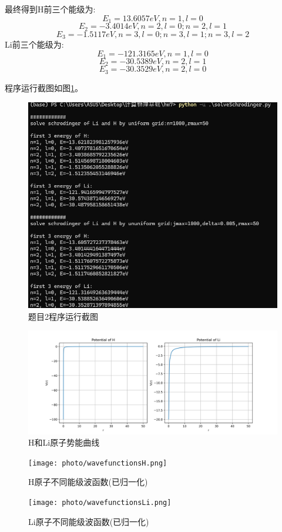 \documentclass[11pt]{article}
\begin{document}
最终得到H前三个能级为:
\[E_1=13.6057eV ,n=1,l=0
\]
\[
E_2=-3.4014eV ,n=2,l=0;n=2,l=1
\]
\[
E_3=-1.5117eV ,n=3,l=0;n=3,l=1;n=3,l=2
\]
Li前三个能级为:
\[
E_1=-121.3165eV ,n=1,l=0
\]
\[
E_2=-30.5389eV ,n=2,l=1
\]
\[
E_3=-30.3529eV ,n=2,l=0
\]

程序运行截图如图\ref{fig:p2}。

\begin{figure}
  \centering
  \includegraphics[width=0.8\linewidth]{photo/figp2.png}
  \caption{题目2程序运行截图}
  \label{fig:p2}
\end{figure}


\begin{figure}
  \centering
  \includegraphics[width=1\linewidth]{photo/potentialLi.png}
  \caption{H和Li原子势能曲线}
  \label{fig:potentialLi}
\end{figure}

\begin{figure}
  \centering
  \texttt{[image: photo/wavefunctionsH.png]}
  \caption{H原子不同能级波函数(已归一化)}
  \label{fig:wavefunctionsH}
\end{figure}

\begin{figure}
  \centering
  \texttt{[image: photo/wavefunctionsLi.png]}
  \caption{Li原子不同能级波函数(已归一化)}
  \label{fig:wavefunctionsLi}
\end{figure}
\end{document}
